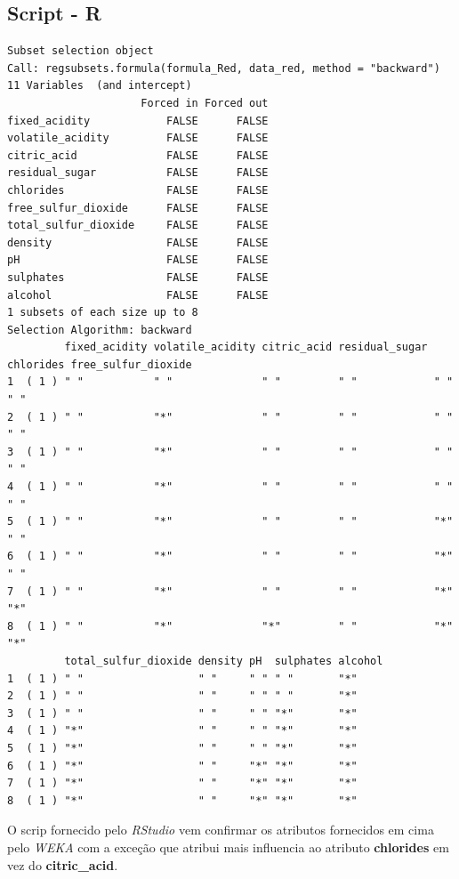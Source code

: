 \documentclass{report}
\begin{document}
\subsection{Script - R}
\begin{verbatim}
Subset selection object
Call: regsubsets.formula(formula_Red, data_red, method = "backward")
11 Variables  (and intercept)
                     Forced in Forced out
fixed_acidity            FALSE      FALSE
volatile_acidity         FALSE      FALSE
citric_acid              FALSE      FALSE
residual_sugar           FALSE      FALSE
chlorides                FALSE      FALSE
free_sulfur_dioxide      FALSE      FALSE
total_sulfur_dioxide     FALSE      FALSE
density                  FALSE      FALSE
pH                       FALSE      FALSE
sulphates                FALSE      FALSE
alcohol                  FALSE      FALSE
1 subsets of each size up to 8
Selection Algorithm: backward
         fixed_acidity volatile_acidity citric_acid residual_sugar chlorides free_sulfur_dioxide
1  ( 1 ) " "           " "              " "         " "            " "       " "                
2  ( 1 ) " "           "*"              " "         " "            " "       " "                
3  ( 1 ) " "           "*"              " "         " "            " "       " "                
4  ( 1 ) " "           "*"              " "         " "            " "       " "                
5  ( 1 ) " "           "*"              " "         " "            "*"       " "                
6  ( 1 ) " "           "*"              " "         " "            "*"       " "                
7  ( 1 ) " "           "*"              " "         " "            "*"       "*"                
8  ( 1 ) " "           "*"              "*"         " "            "*"       "*"                
         total_sulfur_dioxide density pH  sulphates alcohol
1  ( 1 ) " "                  " "     " " " "       "*"    
2  ( 1 ) " "                  " "     " " " "       "*"    
3  ( 1 ) " "                  " "     " " "*"       "*"    
4  ( 1 ) "*"                  " "     " " "*"       "*"    
5  ( 1 ) "*"                  " "     " " "*"       "*"    
6  ( 1 ) "*"                  " "     "*" "*"       "*"    
7  ( 1 ) "*"                  " "     "*" "*"       "*"    
8  ( 1 ) "*"                  " "     "*" "*"       "*"  
\end{verbatim}

O scrip fornecido pelo \textit{RStudio} vem confirmar os atributos fornecidos em cima pelo \textit{WEKA} com a exceção que atribui mais influencia ao atributo \textbf{chlorides} em vez do \textbf{citric\_acid}.
\end{document}
